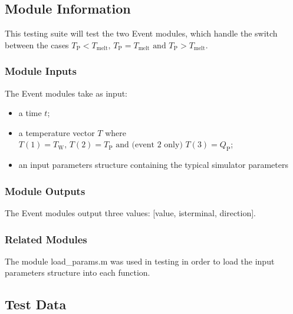 \documentclass[12pt]{article}
\begin{document}
\subsection{Module Information}
This testing suite will test the two Event modules, which handle the switch 
between the cases $T_{\text{P}} < T_{\text{melt}} \text{, } T_{\text{P}} = T_{\text{melt}}
\text{ and } T_{\text{P}} > T_{\text{melt}}$.

\subsubsection{Module Inputs}
The Event modules take as input:
\begin{itemize}
\item a time $t$;
\item a temperature vector $T$ where $T(1) = T_{\text{W}} \text{, } 
T(2) = T_{\text{P}} \text{ and (event 2 only) } T(3) = Q_{\text{P}}$;
\item an input parameters structure containing the typical simulator parameters
\end{itemize}

\subsubsection{Module Outputs}
The Event modules output three values: [value, isterminal, direction]. 

\subsubsection{Related Modules}
The module load\_params.m was used in testing in order to load the input parameters 
structure into each function.

\subsection{Test Data}
\end{document}
